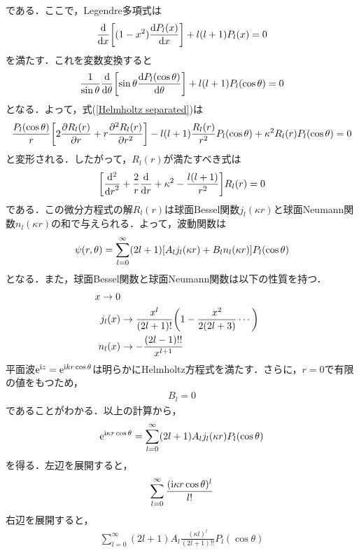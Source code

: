 \documentclass{report}
\begin{document}
  である．ここで，Legendre多項式は
  \begin{align}
    \frac{\mathrm{d}}{\dd{x}}\qty[(1-x^2)\frac{\mathrm{d}P_l(x)}{\dd{x}}] + l(l+1)P_l(x) = 0
  \end{align}
  を満たす．これを変数変換すると
  \begin{align}
    \frac{1}{\sin\theta}\frac{\mathrm{d}}{\dd{\theta}}\qty[\sin\theta\frac{\mathrm{d}P_l(\cos\theta)}{\dd{\theta}}] + l(l+1)P_l(\cos\theta) = 0
  \end{align}
  となる．よって，式(\ref{Helmholtz separated})は
  \begin{align}
    \frac{P_l(\cos\theta)}{r}\qty[2\frac{\partial R_l(r)}{\partial r} + r \frac{\partial^2 R_l(r)}{\partial r^2}]
    - l(l+1)\frac{R_l(r)}{r^2}P_l(\cos\theta)  + \kappa^2 R_l(r)P_l(\cos\theta) = 0
  \end{align}
  と変形される．したがって，$R_l(r)$が満たすべき式は
  \begin{align}
    \qty[\frac{\mathrm{d}^2}{\dd{r}^2} + \frac{2}{r} \dv{}{r} + \kappa^2 - \frac{l(l+1)}{r^2}]R_l(r) = 0
  \end{align}
  である．この微分方程式の解$R_l(r)$は球面Bessel関数$j_l(\kappa r)$と球面Neumann関数$n_l(\kappa r)$の和で与えられる．よって，波動関数は
  \begin{align}
    \psi(r,\theta) = \sum_{l=0}^{\infty} (2l+1)\qty[A_l j_l(\kappa r) + B_l n_l(\kappa r)] P_l(\cos\theta)
  \end{align} 
  となる．また，球面Bessel関数と球面Neumann関数は以下の性質を持つ．
  \begin{align}
    x \to 0\\
    j_l(x) &\to \frac{x^l}{(2l+1)!}\qty(1 - \frac{x^2}{2(2l+3)}\cdots)\\
    n_l(x) &\to -\frac{(2l -1)!!}{x^{l+1}}
  \end{align}
  平面波$\mathrm{e}^{\mathrm{i}  z} = \mathrm{e}^{\mathrm{i} kr\cos\theta}$は明らかにHelmholtz方程式を満たす．さらに，$r=0$で有限の値をもつため，
  \begin{align}
    B_l =0
  \end{align} 
  であることがわかる．以上の計算から，
  \begin{align}
    \mathrm{e}^{\mathrm{i} \kappa r\cos\theta} = \sum_{l=0}^{\infty} (2l+1)A_l j_l(\kappa r) P_l(\cos\theta)
  \end{align}
  を得る．左辺を展開すると，
  \begin{align}
    \sum_{l=0}^{\infty}\frac{(\mathrm{i} \kappa r \cos\theta)^l}{l!}
  \end{align}
  右辺を展開すると，
  \begin{align}
    \sum_{l=0}^{\infty} (2l+1)A_l\frac{(\kappa l)^l}{(2l+1)!!}P_l(\cos\theta)
  \end{align}
\end{document}
